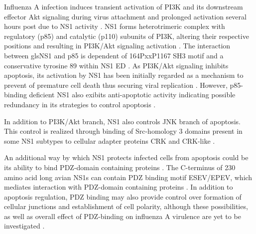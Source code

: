 		Influenza A infection induces transient activation of \gls{PI3K} and its downstream effector Akt signaling during virus attachment and prolonged activation several hours post due to \gls{NS1} activity \parencite{Ehrhardt2006, Ehrhardt2009}. \gls{NS1} forms heterotrimeric complex with regulatory (p85) and catalytic (p110) subunits of \gls{PI3K}, altering their respective positions and resulting in \gls{PI3K}/Akt signaling activation \parencite{Hale2008d, Hale2010c}. The interaction between gls{NS1} and p85 is dependent of \textsc{164}PxxP1\textsc{167} SH3 motif and a conservative tyrosine 89 within \gls{NS1} \gls{ED} \parencite{Hale2006, Shin2007a, Shin2007}. As \gls{PI3K}/Akt signaling inhibits apoptosis, its activation by \gls{NS1} has been initially regarded as a mechanism to prevent of premature cell death thus securing viral replication \parencite{Ehrhardt2007, Zhirnov2007}. However, p85-binding deficient \gls{NS1} also exibits anti-apoptotic activity indicating possible redundancy in its strategies to control apoptosis \parencite{Jackson2010a}.
		
		In addition to \gls{PI3K}/Akt branch, \gls{NS1} also controls \gls{JNK} branch of apoptosis. This control is realized through binding of Src-homology 3 domains present in some \gls{NS1} subtypes to cellular adapter proteins CRK and CRK-like \parencite{Heikkinen2008, Hrincius2010}.
		
		An additional way by which \gls{NS1} protects infected cells from apoptosis could be its ability to bind PDZ-domain containing proteins \parencite{Liu2010}. The C-terminus of 230 amino acid long avian \gls{NS1}s can contain PDZ binding motif ESEV/EPEV, which mediates interaction with PDZ-domain containing proteins \parencite{Golebiewski2011}. In addition to apoptosis regulation, PDZ binding may also provide control over formation of cellular junctions and establishment of cell polarity, although these possibilities, as well as overall effect of PDZ-binding on influenza A virulence are yet to be investigated \parencite{Jackson2010, Zielecki2010, Javier2011}.
		
		
		
		
				
	
		
